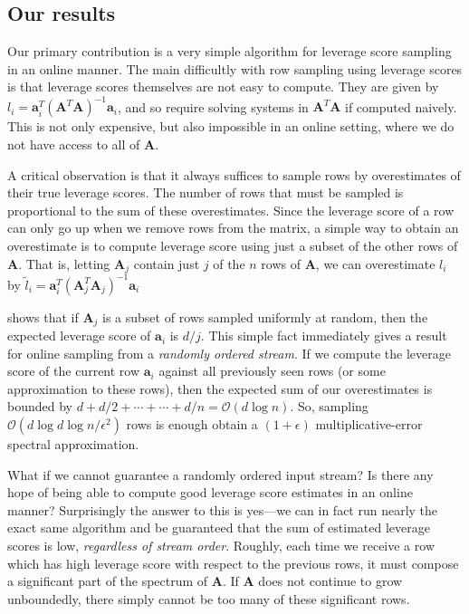 \documentclass[11pt]{article}
\numberwithin{equation}{section}
\theoremstyle{definition}
\theoremstyle{plain}
\newcommand{\Oh}{\ensuremath{\mathcal{O}}}
\newcommand{\bv}[1]{\mathbf{#1}}
\begin{document}
\subsection{Our results}

Our primary contribution is a very simple algorithm for leverage score sampling in an online manner. The main difficultly with row sampling using leverage scores is that leverage scores themselves are not easy to compute. They are given by $l_i = \bv{a}_i^T (\bv{A}^T\bv{A})^{-1} \bv{a}_i$, and so require solving systems in  $\bv{A}^T\bv{A}$ if computed naively. This is not only expensive, but also impossible in an online setting, where we do not have access to all of $\bv{A}$.

A critical observation is that
it always suffices to sample rows by overestimates of their true leverage scores. The number of rows that must be sampled is proportional to the sum of these overestimates.
Since the leverage score of a row can only go up when we remove rows from the matrix, a
simple way to obtain an overestimate is to compute leverage score using just a subset of the other rows of $\bv{A}$. That is, letting $\bv{A}_j$ contain just $j$ of the $n$ rows of $\bv{A}$, we can overestimate $l_i$ by $\tilde l_i = \bv{a}_i^T (\bv{A}_j^T\bv{A}_j)^{-1} \bv{a}_i$
 
\cite{cohen2015uniform} shows that
if $\bv{A}_j$ is a subset of rows sampled uniformly at random, then the expected leverage score of $\bv{a}_i$ is $d/j$. This simple fact immediately gives a result for online sampling from a \emph{randomly ordered stream}.
If we compute the leverage score of the current row $\bv{a}_i$ against all previously seen rows (or some approximation to these rows), then the expected sum of our overestimates is bounded by $d + d/2 + \cdots + \cdots + d/n = \Oh(d \log n)$. So, sampling $\Oh(d\log d \log n /\epsilon^2)$ rows is enough obtain a $(1+\epsilon)$ multiplicative-error spectral approximation.

What if we cannot guarantee a randomly ordered input stream? Is there any hope of being able to compute good leverage score estimates in an online manner? Surprisingly the answer to this is yes---we can in fact run nearly the exact same algorithm and be guaranteed that the sum of estimated leverage scores is low, \emph{regardless of stream order}. Roughly, each time we receive a row which has high leverage score with respect to the previous rows, it must compose a significant part of the spectrum  of $\bv{A}$. If $\bv{A}$ does not continue to grow unboundedly, there simply cannot be too many of these significant rows.
\end{document}
